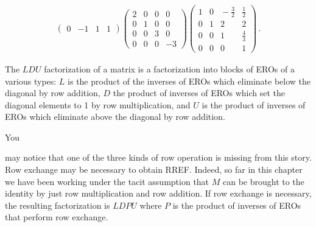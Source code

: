 \begin{example}
\begin{align*}
\begin{pmatrix}
0&-1&1&1
\end{pmatrix} 
\begin{pmatrix}
2&0&0&0\\
0&1&0&0\\
0&0&3&0\\
0&0&0&-3
\end{pmatrix} 
\begin{pmatrix}
1&0&\!\!-\frac{3}{2}&\frac{1}{2}\\
0&1&2&2\\
0&0&1&\frac43\\
0&0&0&1
\end{pmatrix}\, .
\end{align*}
\end{example}

The $LDU$ factorization of a matrix is a factorization into blocks of EROs of a various types: $L$ is the product of the inverses of EROs which eliminate below the diagonal by row addition, $D$ the product of inverses of EROs which set the diagonal elements to 1 by row multiplication, and $U$ is the product of inverses of EROs which eliminate above the diagonal by row addition.

\hypertarget{LDPU}{You} may notice that one of the three kinds of row operation is missing from this story. 
Row exchange may  be necessary to obtain RREF. Indeed, 
so far in this chapter we have been working under the tacit assumption that 
$M$ can be brought to the identity by just row multiplication and row addition. 
If row exchange is necessary, the resulting factorization is $LDPU$ where $P$ is the product of inverses of EROs that perform row exchange. 

